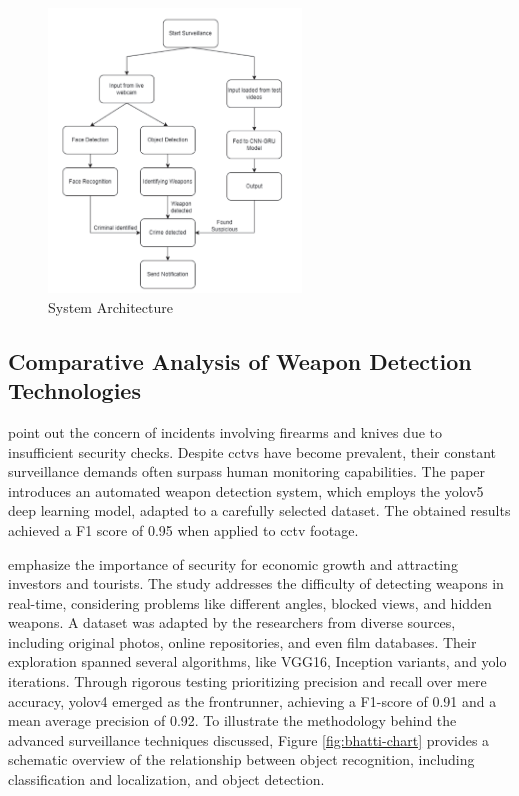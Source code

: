 \begin{figure}[h]
    \centering 
    \includegraphics[width=0.6\textwidth]{figs/shenoy-architecture.png} 
    \caption{\citet{rfc7} System Architecture}
    \label{fig:shenoy-architecture}
\end{figure}

\subsection{Comparative Analysis of Weapon Detection Technologies}
\citet{rfc3} point out the concern of incidents involving firearms and knives due to insufficient security checks. Despite \ac{cctv}s have become prevalent, their constant surveillance demands often surpass human monitoring capabilities. The paper introduces an automated weapon detection system, which employs the \ac{yolo}v5 deep learning model, adapted to a carefully selected dataset. The obtained results achieved a F1 score of 0.95 when applied to \ac{cctv} footage.

\citet{rfc4} emphasize the importance of security for economic growth and attracting investors and tourists. The study addresses the difficulty of detecting weapons in real-time, considering problems like different angles, blocked views, and hidden weapons. A dataset was adapted by the researchers from diverse sources, including original photos, online repositories, and even film databases. Their exploration spanned several algorithms, like VGG16, Inception variants, and \ac{yolo} iterations. Through rigorous testing prioritizing precision and recall over mere accuracy, \ac{yolo}v4 emerged as the frontrunner, achieving a F1-score of 0.91 and a mean average precision of 0.92. To illustrate the methodology behind the advanced surveillance techniques discussed, Figure \ref{fig:bhatti-chart} provides a schematic overview of the relationship between object recognition, including classification and localization, and object detection.

